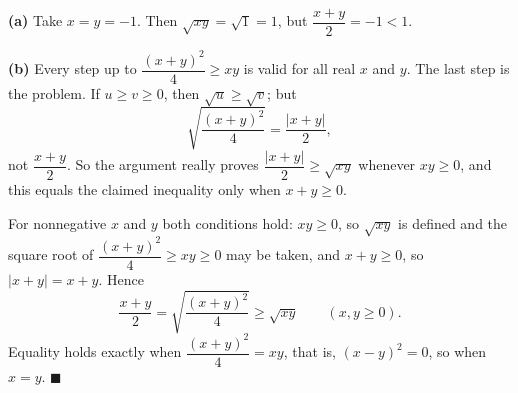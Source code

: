 \textbf{(a)} Take $x=y=-1$. Then $\sqrt{xy}=\sqrt1=1$, but $\dfrac{x+y}{2}=-1<1$.

\textbf{(b)} Every step up to $\dfrac{(x+y)^2}{4}\ge xy$ is valid for all real $x$ and $y$. The last step is the problem. If $u\ge v\ge0$, then $\sqrt u\ge\sqrt v$; but
\[\sqrt{\dfrac{(x+y)^2}{4}}=\dfrac{|x+y|}{2},\]
not $\dfrac{x+y}{2}$. So the argument really proves $\dfrac{|x+y|}{2}\ge\sqrt{xy}$ whenever $xy\ge0$, and this equals the claimed inequality only when $x+y\ge0$.

For nonnegative $x$ and $y$ both conditions hold: $xy\ge0$, so $\sqrt{xy}$ is defined and the square root of $\dfrac{(x+y)^2}{4}\ge xy\ge0$ may be taken, and $x+y\ge0$, so $|x+y|=x+y$. Hence
\[\dfrac{x+y}{2}=\sqrt{\dfrac{(x+y)^2}{4}}\ge\sqrt{xy}\qquad(x,y\ge0).\]
Equality holds exactly when $\dfrac{(x+y)^2}{4}=xy$, that is, $(x-y)^2=0$, so when $x=y$. $\blacksquare$
